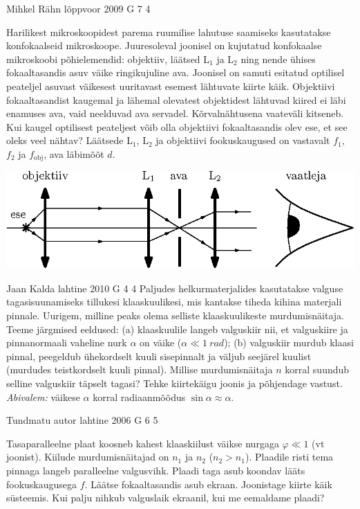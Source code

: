\documentclass[11pt]{article}
\begin{document}
{%
{Mihkel Rähn} %
{lõppvoor} %
{2009} %
{G 7} %
{4} %
{
\ifStatement
Harilikest mikroskoopidest parema ruumilise lahutuse saamiseks kasutatakse konfokaalseid
mikroskoope. Juuresoleval joonisel on kujutatud konfokaalse mikroskoobi põhielemendid:
objektiiv, läätsed L$_1$ ja L$_2$ ning nende ühises fokaaltasandis asuv väike ringikujuline ava.
Joonisel on samuti esitatud optilisel peateljel asuvast väikesest uuritavast esemest lähtuvate
kiirte käik.
Objektiivi fokaaltasandist kaugemal ja lähemal olevatest
objektidest lähtuvad kiired ei läbi enamuses ava, vaid neelduvad ava servadel.
Kõrvalnähtusena vaateväli kitseneb. Kui kaugel optilisest peateljest
võib olla objektiivi fokaaltasandis olev ese, et see oleks veel nähtav? Läätsede L$_1$, L$_2$ ja objektiivi fookuskaugused on vastavalt $f_1$, $f_2$ ja $f_{\mathrm{obj}}$, ava läbimõõt $d$.

\begin{center}
	\includegraphics[width=0.8\linewidth]{2009-v3g-07-G_konfokaalne_mikroskoop.eps}
\end{center}
\fi
}

{Jaan Kalda} %
{lahtine} %
{2010} %
{G 4} %
{4} %
{
\ifStatement
Paljudes helkurmaterjalides kasutatakse valguse tagasisuunamiseks tillukesi
klaaskuulikesi, mis kantakse tiheda kihina materjali pinnale. Uurigem, milline
peaks olema selliste klaaskuulikeste murdumisnäitaja. Teeme järgmised eeldused:
(a) klaaskuulile langeb valguskiir nii, et valguskiire ja pinnanormaali vaheline
nurk $\alpha$ on väike ($\alpha \ll \SI{1}{rad}$); (b) valguskiir murdub klaasi
pinnal, peegeldub ühekordselt kuuli sisepinnalt ja väljub seejärel kuulist
(murdudes teistkordselt kuuli pinnal). Millise murdumisnäitaja $n$ korral
suundub selline valguskiir täpselt tagasi? Tehke kiirtekäigu joonis ja
põhjendage vastust. \emph{Abivalem:} väikese $\alpha$ korral radiaanmõõdus
$\sin\alpha \approx \alpha$.
\fi
}

{Tundmatu autor} %
{lahtine} %
{2006} %
{G 6} %
{5} %
{
\ifStatement
Tasaparalleelne plaat koosneb kahest klaaskiilust väikse nurgaga $\varphi \ll 1$ (vt joonist). Kiilude murdumisnäitajad on $n_1$ ja $n_2$ ($n_2 > n_1$). Plaadile risti tema pinnaga langeb paralleelne valgusvihk. Plaadi taga asub koondav lääts fookuskaugusega $f$. Läätse fokaaltasandis asub ekraan. Joonistage kiirte käik süsteemis. Kui palju nihkub valguslaik ekraanil, kui me eemaldame plaadi? 

}}
\end{document}

